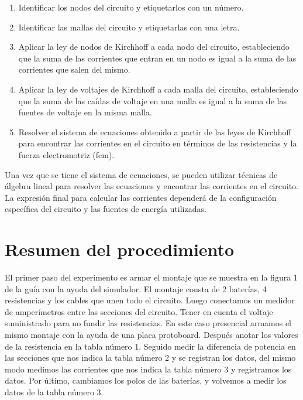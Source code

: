 \documentclass[twocolumn, 12pt]{article}
\begin{document}
\begin{enumerate}
	\item Identificar los nodos del circuito y etiquetarlos con un
	      número.
	\item Identificar las mallas del circuito y etiquetarlas con una
	      letra.
	\item Aplicar la ley de nodos de Kirchhoff a cada nodo del
	      circuito, estableciendo que la suma de las corrientes que
	      entran en un nodo es igual a la suma de las corrientes que
	      salen del mismo.
	\item Aplicar la ley de voltajes de Kirchhoff a cada malla del
	      circuito, estableciendo que la suma de las caídas de
	      voltaje en una malla es igual a la suma de las fuentes de
	      voltaje en la misma malla.
	\item Resolver el sistema de ecuaciones obtenido a partir de las
	      leyes de Kirchhoff para encontrar las corrientes en el
	      circuito en términos de las resistencias y la fuerza
	      electromotriz (fem).
\end{enumerate}

Una vez que se tiene el sistema de ecuaciones, se pueden
utilizar técnicas de álgebra lineal para resolver las
ecuaciones y encontrar las corrientes en el circuito. La
expresión final para calcular las corrientes dependerá de
la configuración específica del circuito y las fuentes de
energía utilizadas.

\section{Resumen del procedimiento}

El primer paso del experimento es armar el montaje que se
muestra en la figura 1 de la guía con la ayuda del
simulador. El montaje consta de 2 baterías, 4 resistencias
y los cables que unen todo el circuito. Luego conectamos un
medidor de amperímetros entre las secciones del circuito.
Tener en cuenta el voltaje suministrado para no fundir las
resistencias. En este caso presencial armamos el mismo
montaje con la ayuda de una placa protoboard. Después
anotar los valores de la resistencia en la tabla número 1.
Seguido medir la diferencia de potencia en las secciones
que nos indica la tabla número 2 y se registran los datos,
del mismo modo medimos las corrientes que nos indica la
tabla número 3 y registramos los datos. Por último,
cambiamos los polos de las baterías, y volvemos a medir los
datos de la tabla número 3.

\newpage

\printbibliography
\end{document}
